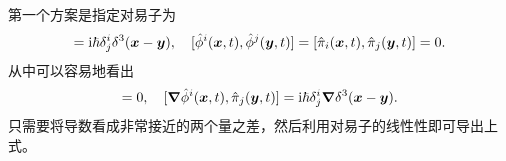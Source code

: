 \documentclass[hyperref, UTF8, a4paper]{ctexart}
\newcommand*{\ii}{\mathrm{i}}
\begin{document}
第一个方案是指定对易子为
\begin{equation}
    [\hat{\phi}^i(\vb*{x}, t), \hat{\pi}_j(\vb*{y}, t)] = \ii \hbar \delta^i_j \delta^3(\vb*{x} - \vb*{y}), 
    \quad [\hat{\phi}^i(\vb*{x}, t), \hat{\phi}^j(\vb*{y}, t)] = [\hat{\pi}_i(\vb*{x}, t), \hat{\pi}_j(\vb*{y}, t)] = 0.
    \label{eq:symmetry-commutator}
\end{equation}
从中可以容易地看出
\begin{equation}
    [\partial_\mu \hat{\phi}^i(\vb*{x}, t), \hat{\phi}^j(\vb*{y}, t)] = 0, 
    \quad [\grad{\hat{\phi}^i(\vb*{x}, t)}, \hat{\pi}_j(\vb*{y}, t)] = \ii \hbar \delta^i_j \grad{\delta^3(\vb*{x} - \vb*{y})}.
    \label{eq:symmetry-partial-mu-commutator}
\end{equation}
只需要将导数看成非常接近的两个量之差，然后利用对易子的线性性即可导出上式。
\end{document}
